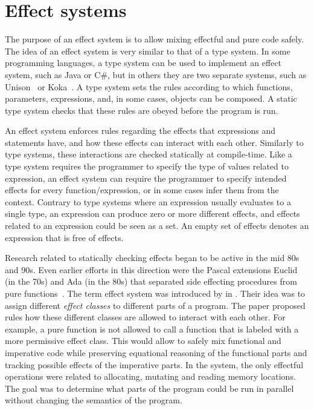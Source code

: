 \section{Effect systems}\label{effects:effect-systems}
The purpose of an effect system is to allow mixing effectful and pure code safely. The idea of an effect system is very similar to that of a type system. In some programming languages, a type system can be used to implement an effect system, such as Java or C\#, but in others they are two separate systems, such as Unison~\cite{unison-lang} or Koka~\cite{koka-lang}. A type system sets the rules according to which functions, parameters, expressions, and, in some cases, objects can be composed. A static type system checks that these rules are obeyed before the program is run.

An effect system enforces rules regarding the effects that expressions and statements have, and how these effects can interact with each other. Similarly to type systems, these interactions are checked statically at compile-time. Like a type system requires the programmer to specify the type of values related to expression, an effect system can require the programmer to specify intended effects for every function/expression, or in some cases infer them from the context. Contrary to type systems where an expression usually evaluates to a single type, an expression can produce zero or more different effects, and effects related to an expression could be seen as a set. An empty set of effects denotes an expression that is free of effects.

Research related to statically checking effects began to be active in the mid 80s and 90s. Even earlier efforts in this direction were the Pascal extensions Euclid (in the 70s) and Ada (in the 80s) that separated side effecting procedures from pure functions~\cite{real-prog-in-fp}. The term effect system was introduced by \textcite{intgr-fp-ip} in \citeyear{intgr-fp-ip}. Their idea was to assign different \textit{effect classes} to different parts of a program. The paper proposed rules how these different classes are allowed to interact with each other. For example, a pure function is not allowed to call a function that is labeled with a more permissive effect class. This would allow to safely mix functional and imperative code while preserving equational reasoning of the functional parts and tracking possible effects of the imperative parts.
In the system, the only effectful operations were related to allocating, mutating and reading memory locations.
The goal was to determine what parts of the program could be run in parallel without changing the semantics of the program.

